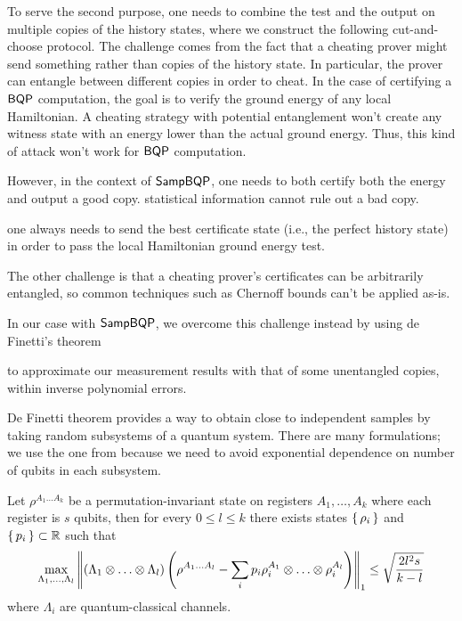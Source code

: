 To serve the second purpose, one needs to combine the test and the output on multiple copies of the history states, where we construct the following cut-and-choose protocol.  
The challenge comes from the fact that a cheating prover might send something rather than copies of the history state. 
In particular, the prover can entangle between different copies in order to cheat. 
In the case of certifying a $\operatorname{\mathsf{BQP}}$ computation, the goal is to verify the ground energy of any local Hamiltonian. 
A cheating strategy with potential entanglement won't create any witness state with an energy lower than the actual ground energy. 
Thus, this kind of attack won't work for $\operatorname{\mathsf{BQP}}$ computation. 

However, in the context of $\operatorname{\mathsf{SampBQP}}$, one needs to both certify both the energy and output a good copy. statistical information cannot rule out a bad copy. 



one always needs to send the best certificate state (i.e., the perfect history state) in order to pass the local Hamiltonian ground energy test. 

The other challenge is that a cheating prover's certificates can be arbitrarily entangled,
so common techniques such as Chernoff bounds can't be applied as-is.


In our case with $\operatorname{\mathsf{SampBQP}}$, we overcome this challenge instead by using de Finetti's theorem

to approximate our measurement results with that of some unentangled copies,
within inverse polynomial errors.

De Finetti theorem provides a way to obtain close to independent samples by taking random subsystems of a quantum system.
There are many formulations; we use the one from \cite{Brandão2017} because we need to avoid exponential dependence on number of qubits in each subsystem.
\begin{thm}
	\label{deFinetti}
	Let $\rho^{A_1\ldots A_k}$ be a permutation-invariant state on registers $A_1,\ldots,A_k$ where each register is $s$ qubits,
	then for every $0\leq l\leq k$ there exists states $\set{\rho_i}$ and $\set{p_i}\subset\mathbb{R}$ such that
	$$\max_{\Lambda_1,\ldots,\Lambda_l}
	\left\lVert(\Lambda_1\otimes\ldots\otimes\Lambda_l)\left(\rho^{A_1\ldots A_l}-\sum_ip_i\rho_i^{A_1}\otimes\ldots\otimes\rho_i^{A_l}\right)\right\rVert_1
	\leq\sqrt{\frac{2l^2s}{k-l}}$$
	where $\Lambda_i$ are quantum-classical channels.
\end{thm}

